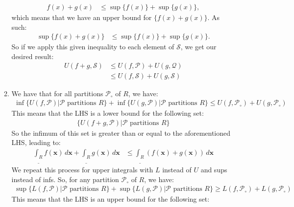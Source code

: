 \documentclass{article}%
\begin{document}
\begin{enumerate}
\begin{enumerate}
        \begin{align*}
            f(x) + g(x) &\leq \sup\{f(x)\} + \sup\{g(x)\},
        \end{align*}
        which means that we have an upper bound for $\{f(x) + g(x)\}$. As such:
        \begin{align*}
            \sup\{f(x) + g(x)\} &\leq \sup\{f(x)\} + \sup\{g(x)\}.
        \end{align*}
        So if we apply this given inequality to each element of $\mathcal{S}$, we get our desired result:
        \begin{align*}
            U(f + g, \mathcal{S}) &\leq U(f, \mathcal{P}) + U(g, \mathcal{Q})\\
            &\leq U(f, \mathcal{S}) + U(g, \mathcal{S})
        \end{align*}
        \newpage
        \item 
        We have that for all partitions $\mathcal{P}_\circ$ of $R$, we have:
        \begin{align*}
            \inf\{U(f, \mathcal{P}) | \mathcal{P} \text{ partitions } R\} + \inf\{U(g, \mathcal{P}) | \mathcal{P} \text{ partitions } R\} \leq U(f, \mathcal{P}_\circ) + U(g, \mathcal{P}_\circ)
        \end{align*}
        This means that the LHS is a lower bound for the following set:
        \begin{align*}
            \{U(f + g, \mathcal{P}) | \mathcal{P} \text{ partitions } R\}
        \end{align*}
        So the infimum of this set is greater than or equal to the aforementioned LHS, leading to:
        \begin{align*}
            \underline{\int_{R}}f\left(  \boldsymbol{x}\right)  \,d\boldsymbol{x}%
+\underline{\int_{R}}g\left(  \boldsymbol{x}\right)  \,d\boldsymbol{x}  &
\leq\underline{\int_{R}}\left(  f\left(  \boldsymbol{x}\right)  +g\left(
\boldsymbol{x}\right)  \right)  \,d\boldsymbol{x}
        \end{align*}
        We repeat this process for upper integrals with $L$ instead of $U$ and sups instead of infs. So, for any partition $\mathcal{P}_\circ$ of $R$, we have:
        \begin{align*}
            \sup\{L(f, \mathcal{P}) | \mathcal{P} \text{ partitions } R\} + \sup\{L(g, \mathcal{P}) | \mathcal{P} \text{ partitions } R\} \geq L(f, \mathcal{P}_\circ) + L(g, \mathcal{P}_\circ)
        \end{align*}
        This means that the LHS is an upper bound for the following set:

\end{enumerate}
\end{enumerate}
\end{document}
